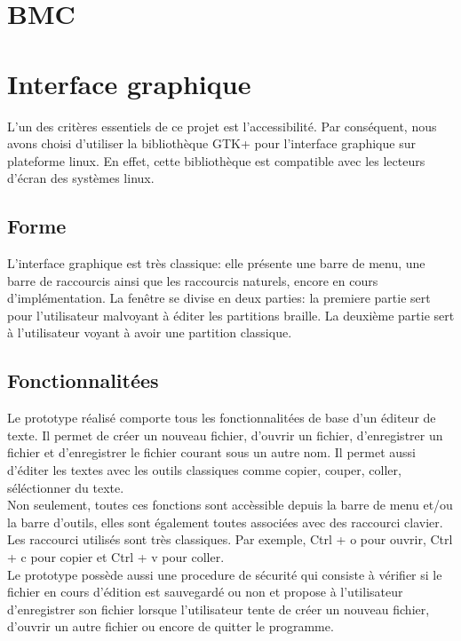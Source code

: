 \section{BMC}

\subsection*{}

\subsection*{}

\subsection*{}



\section{Interface graphique}

L'un des critères essentiels de ce projet est l'accessibilité. Par
conséquent, nous avons choisi d'utiliser la bibliothèque GTK+ pour
l'interface graphique sur plateforme linux. En effet, cette
bibliothèque est compatible avec les lecteurs d'écran des systèmes
linux.


\subsection*{Forme}
L'interface graphique est très classique: elle présente une barre de
menu, une barre de raccourcis ainsi que les raccourcis naturels,
encore en cours d'implémentation. La fenêtre se divise en deux
parties: la premiere partie sert pour l'utilisateur malvoyant à éditer les partitions braille. La
deuxième partie sert à l'utilisateur voyant à avoir une partition
classique.


\subsection*{Fonctionnalitées}
Le prototype réalisé comporte tous les fonctionnalitées de base d'un
éditeur de texte. Il permet de créer un nouveau fichier, d'ouvrir un
fichier, d'enregistrer un fichier et d'enregistrer le fichier courant
sous un autre nom. Il permet aussi d'éditer les textes avec les outils
classiques comme copier, couper, coller, séléctionner du texte.
\\ Non seulement, toutes ces fonctions sont accèssible depuis la barre
de menu et/ou la barre d'outils, elles sont également toutes associées
avec des raccourci clavier. Les raccourci utilisés sont très
classiques. Par exemple, Ctrl + o pour ouvrir, Ctrl + c pour copier et
Ctrl + v pour coller.
\\ Le prototype possède aussi une procedure de
sécurité qui consiste à vérifier si le fichier en cours d'édition est
sauvegardé ou non et propose à l'utilisateur d'enregistrer son
fichier lorsque l'utilisateur tente de créer un nouveau fichier,
d'ouvrir un autre fichier ou encore de quitter le programme.




